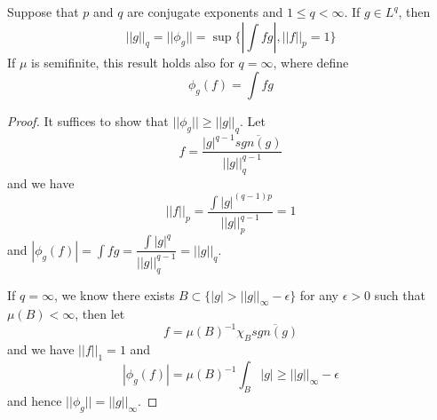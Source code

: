 \documentclass[lang=en, color=blue, ]{elegantbook}
\begin{document}
\begin{proposition}
    Suppose that $p$ and $q$ are conjugate exponents and $1\leq q <\infty$. If $g\in L^q$, then
    \[||g||_q = ||\phi_g|| = \sup\{|\int fg|, ||f||_p = 1\}\]
    If $\mu$ is semifinite, this result holds also for $q=\infty$, where define
    \[\phi_g(f) = \int fg\]
\end{proposition}
\begin{proof}\par
    It suffices to show that $||\phi_g|| \geq ||g||_q$. Let
    \[
    f = \dfrac{|g|^{q-1}\overline{sgn(g)}}{||g||_q^{q-1}}
    \]
    and we have
    \[
    ||f||_p = \dfrac{\int |g|^{(q-1)p}}{||g||_p^{q-1}} = 1
    \]
    and $|\phi_g(f)| = \int fg = \dfrac{\int |g|^q}{||g||_q^{q-1}} = ||g||_q$.\par
    If $q=\infty$, we know there exists $B\subset \{|g|>||g||_{\infty} - \epsilon\}$ for any $\epsilon > 0$ such that $\mu(B) < \infty$, then let
    \[
    f = \mu(B)^{-1} \chi_B \overline{sgn(g)}
    \]
    and we have $||f||_1 = 1$ and
    \[
    |\phi_g(f)| = \mu(B)^{-1}\int_B|g| \geq ||g||_{\infty} - \epsilon
    \]
    and hence $||\phi_g|| = ||g||_{\infty}$.
\end{proof}
\end{document}
